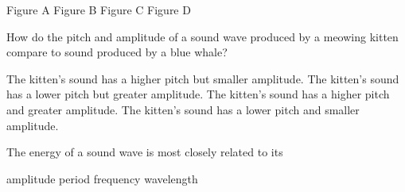 \documentclass[answers]{exam}
\begin{document}
\begin{questions}
\begin{randomizeoneparchoices}[norandomize]
    \choice Figure A
    \choice Figure B
    \choice Figure C
    \correctchoice Figure D
\end{randomizeoneparchoices}

\question
How do the pitch and amplitude of a sound wave produced by a meowing kitten compare to sound produced by a blue whale?

\begin{randomizechoices}
    \correctchoice The kitten's sound has a higher pitch but smaller amplitude.
    \choice The kitten's sound has a lower pitch but greater amplitude.
    \choice The kitten's sound has a higher pitch and greater amplitude.
    \choice The kitten's sound has a lower pitch and smaller amplitude.
\end{randomizechoices}



\question
The energy of a sound wave is most closely related to its

\begin{randomizechoices}
    \correctchoice amplitude
    \choice period
    \choice frequency
    \choice wavelength
\end{randomizechoices}




\end{questions}
\end{document}
